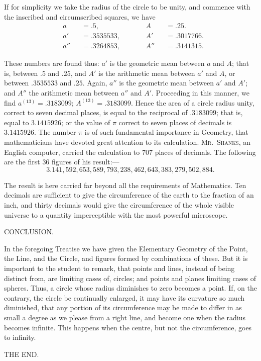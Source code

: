 \documentclass[oneside]{book}
\newcommand{\ibksp}{\hspace{-1.5em}}
\begin{document}
\begin{footnotesize}
If for simplicity we take the radius of the circle to be unity,
and commence with the inscribed and circumscribed squares, we
have
\[
\begin{alignedat}{4}
  &a   &&=.5,              &&A   &&=.25. \\
  &a'  &&=.3535533,\qquad  &&A'  &&=.3017766. \\
  &a'' &&=.3264853,        &&A'' &&=.3141315.
\end{alignedat}
\]

These numbers are found thus: $a'$ is the geometric mean between
$a$ and $A$; that is, between $.5$ and $.25$, and $A'$ is the arithmetic
mean between $a'$ and $A$, or between $.3535533$ and $.25$.
Again, $a''$ is the geometric mean between $a'$ and $A'$; and $A''$ the
arithmetic mean between $a''$ and $A'$. Proceeding in this manner,
we find $a^{(13)}=.3183099$; $A^{(13)} =.3183099$. Hence the area of a
circle radius unity, correct to seven decimal places, is equal to the
reciprocal of $.3183099$; that is, equal to $3.1415926$; or the value
of $\pi$ correct to seven places of decimals is $3.1415926$. The
number $\pi$ is of such fundamental importance in Geometry, that
mathematicians have devoted great attention to its calculation.
\textsc{Mr.\ Shanks}, an English computer, carried the calculation to
$707$ places of decimals. The following are the first $36$ figures
of his result:---
\[
3.141,592,653,589,793,238,462,643,383,279,502,884.
\]

The result is here carried far beyond all the requirements
of Mathematics. Ten decimals are sufficient to give the circumference
of the earth to the fraction of an inch, and thirty
decimals would give the circumference of the whole visible
universe to a quantity imperceptible with the most powerful
microscope.
\end{footnotesize}

\newpage
\addcontentsline{toc}{section}{\bigskip\ibksp Conclusion,}
\begin{center}
CONCLUSION.
\end{center}

In the foregoing Treatise we have given the
Elementary Geometry of the Point, the Line, and
the Circle, and figures formed by combinations of
these. But it is important to the student to remark,
that points and lines, instead of being distinct from,
are limiting cases of, circles; and points and planes
limiting cases of spheres. Thus, a circle whose
radius diminishes to zero becomes a point. If, on
the contrary, the circle be continually enlarged, it
may have its curvature so much diminished, that
any portion of its circumference may be made to
differ in as small a degree as we please from a right
line, and become one when the radius becomes infinite.
This happens when the centre, but not the
circumference, goes to infinity.




\printindex





\begin{center}
THE END.
\end{center}
\end{document}
